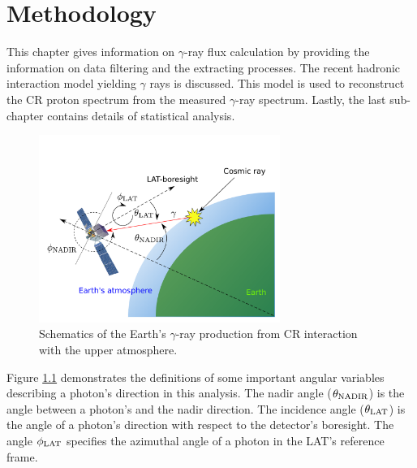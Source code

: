 \chapter{Methodology}

This chapter gives
information on $\gamma$-ray flux calculation 
by providing the information on data filtering and 
the extracting processes.
The recent hadronic interaction model yielding $\gamma$ rays
is discussed. This model is used to reconstruct the CR proton
spectrum from the measured $\gamma$-ray spectrum.
Lastly, the last sub-chapter contains details of statistical analysis.

\begin{figure}[h!]
    \centering
    \includegraphics[width=0.7\textwidth]{content/methodology/figures/for_lat_schematic/FermiLAT_v2.pdf}
    \caption{
        Schematics of the Earth's $\gamma$-ray production
        from CR interaction with the upper atmosphere.
    }
    \label{fig:gamma_emis_sp}
\end{figure}

Figure \ref{fig:gamma_emis_sp} demonstrates the definitions of some important angular
variables describing a photon's direction in this analysis.
The nadir angle ($\theta_{\rm NADIR}$) is the angle between a
photon's and the nadir direction. The incidence angle
($\theta_{\rm LAT}$) is the angle of a photon's direction with
respect to the detector's boresight. The angle $\phi_{\rm LAT}$
specifies the azimuthal angle of a photon in the LAT's
reference frame.


